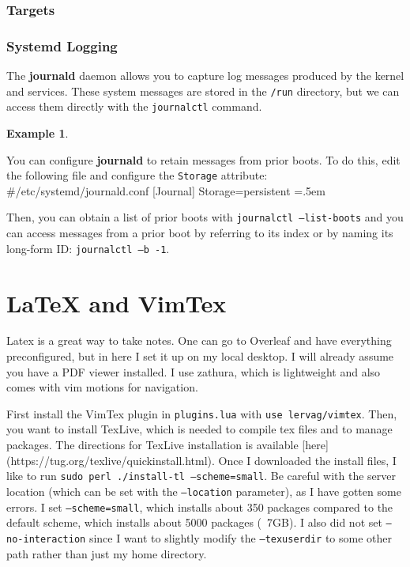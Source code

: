 \documentclass{article}
\theoremstyle{definition}
\newtheorem{example}{Example}[section]
\newenvironment{cverbatim}
    {\SaveVerbatim{cverb}}
    {\endSaveVerbatim
    \flushleft\fboxrule=0pt\fboxsep=.5em
    \colorbox{cverbbg}{%
      \makebox[\dimexpr\linewidth-2\fboxsep][l]{\BUseVerbatim{cverb}}%
    }
    \endflushleft
  }
\begin{document}
    \subsubsection{Targets}

      
    \subsubsection{Systemd Logging}

      The \textbf{journald} daemon allows you to capture log messages produced by the kernel and services. These system messages are stored in the \texttt{/run} directory, but we can access them directly with the \texttt{journalctl}  command. 

      \begin{example}
        
      \end{example}

      You can configure \textbf{journald} to retain messages from prior boots. To do this, edit the following file and configure the \texttt{Storage} attribute: 
      \begin{cverbatim}
      #/etc/systemd/journald.conf
        [Journal]
        Storage=persistent
      \end{cverbatim}

      Then, you can obtain a list of prior boots with \texttt{journalctl --list-boots} and you can access messages from a prior boot by referring to its index or by naming its long-form ID: \texttt{journalctl --b -1}. 

\section{LaTeX and VimTex} 

  Latex is a great way to take notes. One can go to Overleaf and have everything preconfigured, but in here I set it up on my local desktop. I will already assume you have a PDF viewer installed. I use zathura, which is lightweight and also comes with vim motions for navigation. 

  First install the VimTex plugin in \texttt{plugins.lua} with \texttt{use lervag/vimtex}. Then, you want to install TexLive, which is needed to compile tex files and to manage packages. The directions for TexLive installation is available [here](https://tug.org/texlive/quickinstall.html). Once I downloaded the install files, I like to run \texttt{sudo perl ./install-tl --scheme=small}. Be careful with the server location (which can be set with the \texttt{--location} parameter), as I have gotten some errors. I set \texttt{--scheme=small}, which installs about 350 packages compared to the default scheme, which installs about 5000 packages (~7GB). I also did not set \texttt{--no-interaction} since I want to slightly modify the \texttt{--texuserdir} to some other path rather than just my home directory. 
\end{document}
